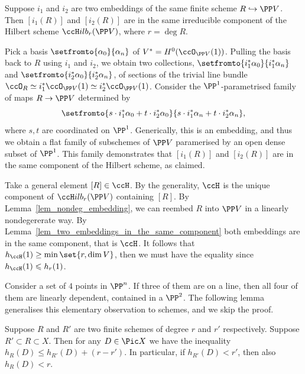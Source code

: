 \documentclass[12pt,a4paper]{article}
\newcommand{\usualHilb}{{\ccH}ilb}
\begin{document}
\begin{lemma}\label{lem_two_embeddings_in_the_same_component}
   Suppose $i_1$ and $i_2$ are two embeddings of the same finite scheme
   $R\hookrightarrow \PP V$.
   Then $[i_1(R)]$ and $[i_2(R)]$ are in the same irreducible component of the Hilbert scheme $\usualHilb_r(\PP V)$, where $r=\deg R$.
\end{lemma}
\begin{prf}
   Pick a basis $\setfromto{\alpha_0}{\alpha_n}$
      of $V^* = H^0(\ccO_{\PP V} (1))$.
   Pulling the basis back to $R$ using $i_1$ and $i_2$,
      we obtain two collections,
      $\setfromto{i_1^*\alpha_0}{i_1^*\alpha_n}$ and
      $\setfromto{i_2^*\alpha_0}{i_2^*\alpha_n}$,
      of sections of the trivial line bundle
      $\ccO_R \simeq i_1^*\ccO_{\PP V} (1) \simeq i_2^*\ccO_{\PP V} (1)$.
   Consider the $\PP^1$-parametrised family of maps $R \to \PP V$
      determined by
      \[
         \setfromto{s \cdot i_1^*\alpha_0+ t\cdot i_2^*\alpha_0}{s \cdot i_1^*\alpha_n+ t\cdot i_2^*\alpha_n},
      \]
      where $s,t$ are coordinated on $\PP^1$.
   Generically, this is an embedding, and thus we obtain a flat family of subschemes of $\PP V$ paramerised by an open dense subset of $\PP^1$.
   This family demonstrates that $[i_1(R)]$ and $[i_2(R)]$ are in the same component of the Hilbert scheme, as claimed.
\end{prf}


\begin{prf}
   Take a general element $[R]\in \ccH$. By the generality, $\ccH$ is the unique component of $\usualHilb_r(\PP V)$ containing $[R]$.
   By Lemma~\ref{lem_nondeg_embedding}, we can reembed $R$ into $\PP V$
      in a linearly nondegererate way.
   By Lemma~\ref{lem_two_embeddings_in_the_same_component}
      both embeddings are in the same component, that is $\ccH$.
   It follows that $h_{\ccH}(1)\ge \min\set{r, \dim V}$,
      then we must have the equality since $h_{\ccH}(1)\leqslant h_r(1)$.
\end{prf}

Consider a set of $4$ points in $\PP^n$.
If three of them are on a line, then all four of them are linearly dependent, contained in a $\PP^2$.
The following lemma generalises this elementary observation to schemes, and we skip the proof.
\begin{lemma}
   \label{lem_defective_subscheme}
   Suppose $R$ and $R'$ are two finite schemes of degree $r$ and $r'$ respectively.
   Suppose $R'\subset R \subset X$.
   Then for any $D\in \Pic X$ we have the inequality
   $h_R(D) \leqslant h_{R'}(D) + (r - r')$.
   In particular, if $h_{R'}(D) < r'$, then also $h_{R}(D) < r$.
\end{lemma}
\noprf
\end{document}
